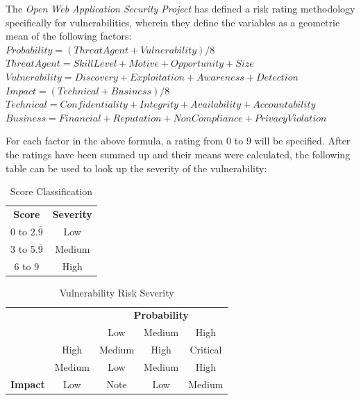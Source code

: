 \documentclass[a4paper,12pt]{article}
\begin{document}
	The \textit{Open Web Application Security Project} has defined a risk rating methodology\cite{owasp4} specifically for vulnerabilities, wherein they define the variables as a geometric mean of the following factors:
	\vspace{1.25em}\\
	$ Probability = (Threat Agent + Vulnerability) / 8 $\\
	\indent $ Threat Agent = Skill Level + Motive + Opportunity + Size $\\
	\indent $ Vulnerability = Discovery + Exploitation + Awareness + Detection $\\
	$ Impact = (Technical + Business) / 8 $\\
	\indent $ Technical = Confidentiality + Integrity + Availability + Accountability $\\
	\indent $ Business = Financial + Reputation + NonCompliance + Privacy Violation $
	
	For each factor in the above formula, a rating from 0 to 9 will be specified. After the ratings have been summed up and their means were calculated, the following table can be used to look up the severity of the vulnerability:
	
	\begin{table}[!htbp]
		\centering
		\begin{tabular}{cc}
			{\bf Score} & {\bf Severity} \\
			0 to 2.$\bar{9}$ & \cellcolor[HTML]{FCFF2F}Low \\
			3 to 5.$\bar{9}$ & \cellcolor[HTML]{F8A102}Medium \\
			6 to 9 & \cellcolor[HTML]{FE0000}High
		\end{tabular}
		\caption{Score Classification}
		\label{scoreclass}
	\end{table}
	
	\begin{table}[!htbp]
		\centering
		\begin{tabular}{ccccc}
			\multicolumn{1}{l}{} & \multicolumn{1}{l}{} & \multicolumn{3}{c}{{\bf Probability}} \\
			\multicolumn{1}{l}{} &  & \cellcolor[HTML]{EFEFEF}Low & \cellcolor[HTML]{C0C0C0}Medium & \cellcolor[HTML]{9B9B9B}High \\
			& \cellcolor[HTML]{9B9B9B}High & \cellcolor[HTML]{F8A102}Medium & \cellcolor[HTML]{FE0000}High & \cellcolor[HTML]{FFCCC9}Critical \\
			& \cellcolor[HTML]{C0C0C0}Medium & \cellcolor[HTML]{FCFF2F}Low & \cellcolor[HTML]{F8A102}Medium & \cellcolor[HTML]{FE0000}High \\
			\multirow{-3}{*}{{\bf Impact}} & \cellcolor[HTML]{EFEFEF}Low & \cellcolor[HTML]{34FF34}Note & \cellcolor[HTML]{FCFF2F}Low & \cellcolor[HTML]{F8A102}Medium
		\end{tabular}
		\caption{Vulnerability Risk Severity}
		\label{vulnrisksever}
	\end{table}
\end{document}
